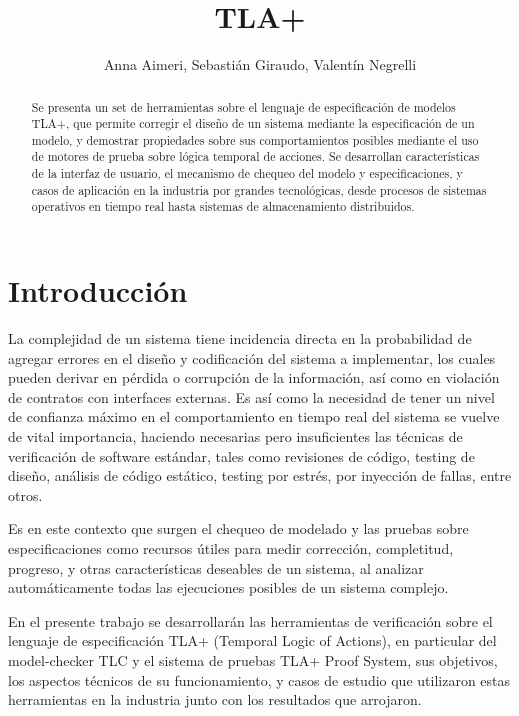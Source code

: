 \documentclass[runningheads]{llncs}
\begin{document}
\title{TLA+}
\author{Anna Aimeri, Sebastián Giraudo, Valentín Negrelli}
\maketitle              %
%
\begin{abstract}
Se presenta un set de herramientas sobre el lenguaje de especificación de modelos TLA+, que permite corregir el diseño de un sistema mediante la especificación de un modelo, y demostrar propiedades sobre sus comportamientos posibles mediante el uso de motores de prueba sobre lógica temporal de acciones. Se desarrollan características de la interfaz de usuario, el mecanismo de chequeo del modelo y especificaciones,  y casos de aplicación en la industria por grandes tecnológicas, desde procesos de sistemas operativos en tiempo real hasta sistemas de almacenamiento distribuidos.
\end{abstract}

\section{Introducción}
La complejidad de un sistema tiene incidencia directa en la probabilidad de agregar errores en el diseño y codificación del sistema a implementar, los cuales pueden derivar en pérdida o corrupción de la información, así como en violación de contratos con interfaces externas. Es así como la necesidad de tener un nivel de confianza máximo en el comportamiento en tiempo real del sistema se vuelve de vital importancia, haciendo necesarias pero insuficientes las técnicas de verificación de software estándar, tales como revisiones de código, testing de diseño, análisis de código estático, testing por estrés, por inyección de fallas, entre otros. 

Es en este contexto que surgen el chequeo de modelado y las pruebas sobre especificaciones como recursos útiles para medir corrección, completitud, progreso, y otras características deseables de un sistema, al analizar automáticamente todas las ejecuciones posibles de un sistema complejo.

En el presente trabajo se desarrollarán las herramientas de verificación sobre el lenguaje de especificación TLA+ (Temporal Logic of Actions), en particular del model-checker TLC y el sistema de pruebas TLA+ Proof System, sus objetivos, los aspectos técnicos de su funcionamiento, y casos de estudio que utilizaron estas herramientas en la industria junto con los resultados que arrojaron.
\end{document}

